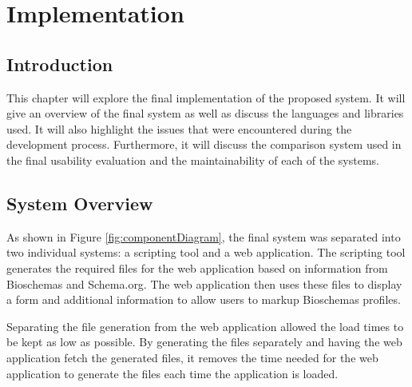 \chapter{Implementation}

\section{Introduction}
This chapter will explore the final implementation of the proposed system. It will give an overview of the final system as well as discuss the languages and libraries used. It will also highlight the issues that were encountered during the development process. Furthermore, it will discuss the comparison system used in the final usability evaluation and the maintainability of each of the systems.

\section{System Overview}
As shown in Figure \ref{fig:componentDiagram}, the final system was separated into two individual systems: a scripting tool and a web application. The scripting tool generates the required files for the web application based on information from Bioschemas and Schema.org. The web application then uses these files to display a form and additional information to allow users to markup Bioschemas profiles.

Separating the file generation from the web application allowed the load times to be kept as low as possible. By generating the files separately and having the web application fetch the generated files, it removes the time needed for the web application to generate the files each time the application is loaded.


